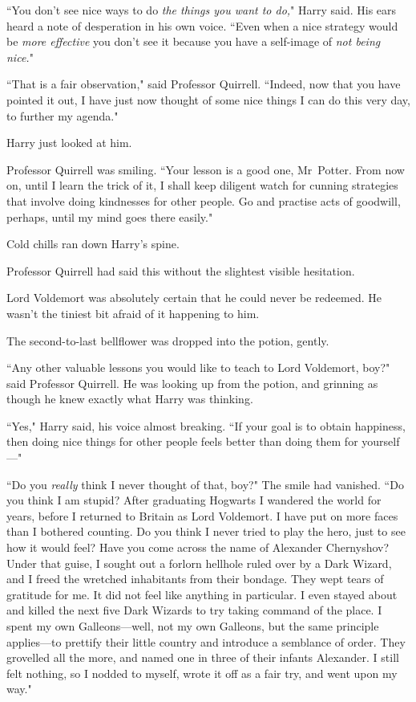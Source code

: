 ``You don't see nice ways to do \emph{the things you want to do,}" Harry said. His ears heard a note of desperation in his own voice. ``Even when a nice strategy would be \emph{more effective} you don't see it because you have a self-image of \emph{not being nice.}"

``That is a fair observation," said Professor Quirrell. ``Indeed, now that you have pointed it out, I have just now thought of some nice things I can do this very day, to further my agenda."

Harry just looked at him.

Professor Quirrell was smiling. ``Your lesson is a good one, Mr~Potter. From now on, until I learn the trick of it, I shall keep diligent watch for cunning strategies that involve doing kindnesses for other people. Go and practise acts of goodwill, perhaps, until my mind goes there easily."

Cold chills ran down Harry's spine.

Professor Quirrell had said this without the slightest visible hesitation.

Lord Voldemort was absolutely certain that he could never be redeemed. He wasn't the tiniest bit afraid of it happening to him.

The second-to-last bellflower was dropped into the potion, gently.

``Any other valuable lessons you would like to teach to Lord Voldemort, boy?" said Professor Quirrell. He was looking up from the potion, and grinning as though he knew exactly what Harry was thinking.

``Yes," Harry said, his voice almost breaking. ``If your goal is to obtain happiness, then doing nice things for other people feels better than doing them for yourself—"

``Do you \emph{really} think I never thought of that, boy?" The smile had vanished. ``Do you think I am stupid? After graduating Hogwarts I wandered the world for years, before I returned to Britain as Lord Voldemort. I have put on more faces than I bothered counting. Do you think I never tried to play the hero, just to see how it would feel? Have you come across the name of Alexander Chernyshov? Under that guise, I sought out a forlorn hellhole ruled over by a Dark Wizard, and I freed the wretched inhabitants from their bondage. They wept tears of gratitude for me. It did not feel like anything in particular. I even stayed about and killed the next five Dark Wizards to try taking command of the place. I spent my own Galleons—well, not my own Galleons, but the same principle applies—to prettify their little country and introduce a semblance of order. They grovelled all the more, and named one in three of their infants Alexander. I still felt nothing, so I nodded to myself, wrote it off as a fair try, and went upon my way."

